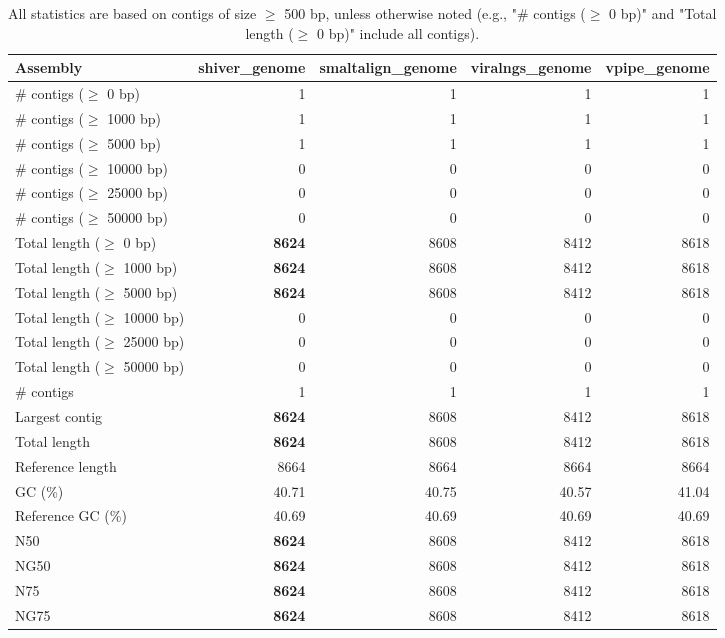 \documentclass[12pt,a4paper]{article}
\begin{document}
\begin{table}[ht]
\begin{center}
\caption{All statistics are based on contigs of size $\geq$ 500 bp, unless otherwise noted (e.g., "\# contigs ($\geq$ 0 bp)" and "Total length ($\geq$ 0 bp)" include all contigs).}
\begin{tabular}{|l*{4}{|r}|}
\hline
Assembly & shiver\_genome & smaltalign\_genome & viralngs\_genome & vpipe\_genome \\ \hline
\# contigs ($\geq$ 0 bp) & 1 & 1 & 1 & 1 \\ \hline
\# contigs ($\geq$ 1000 bp) & 1 & 1 & 1 & 1 \\ \hline
\# contigs ($\geq$ 5000 bp) & 1 & 1 & 1 & 1 \\ \hline
\# contigs ($\geq$ 10000 bp) & 0 & 0 & 0 & 0 \\ \hline
\# contigs ($\geq$ 25000 bp) & 0 & 0 & 0 & 0 \\ \hline
\# contigs ($\geq$ 50000 bp) & 0 & 0 & 0 & 0 \\ \hline
Total length ($\geq$ 0 bp) & {\bf 8624} & 8608 & 8412 & 8618 \\ \hline
Total length ($\geq$ 1000 bp) & {\bf 8624} & 8608 & 8412 & 8618 \\ \hline
Total length ($\geq$ 5000 bp) & {\bf 8624} & 8608 & 8412 & 8618 \\ \hline
Total length ($\geq$ 10000 bp) & 0 & 0 & 0 & 0 \\ \hline
Total length ($\geq$ 25000 bp) & 0 & 0 & 0 & 0 \\ \hline
Total length ($\geq$ 50000 bp) & 0 & 0 & 0 & 0 \\ \hline
\# contigs & 1 & 1 & 1 & 1 \\ \hline
Largest contig & {\bf 8624} & 8608 & 8412 & 8618 \\ \hline
Total length & {\bf 8624} & 8608 & 8412 & 8618 \\ \hline
Reference length & 8664 & 8664 & 8664 & 8664 \\ \hline
GC (\%) & 40.71 & 40.75 & 40.57 & 41.04 \\ \hline
Reference GC (\%) & 40.69 & 40.69 & 40.69 & 40.69 \\ \hline
N50 & {\bf 8624} & 8608 & 8412 & 8618 \\ \hline
NG50 & {\bf 8624} & 8608 & 8412 & 8618 \\ \hline
N75 & {\bf 8624} & 8608 & 8412 & 8618 \\ \hline
NG75 & {\bf 8624} & 8608 & 8412 & 8618 \\ \hline

\end{tabular}
\end{center}
\end{table}
\end{document}
